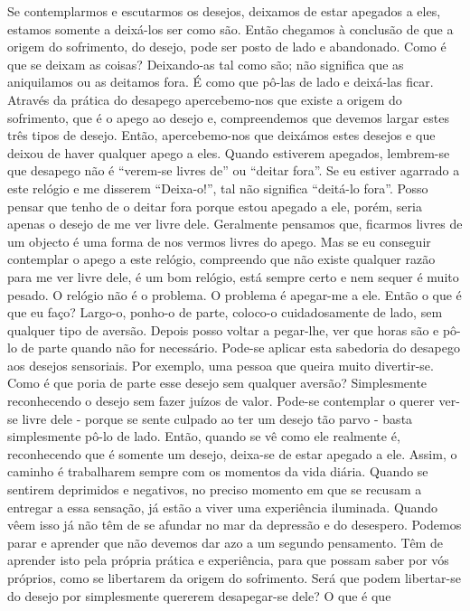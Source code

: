 Se contemplarmos e escutarmos os desejos, deixamos de
estar apegados a eles, estamos somente a deixá-los ser como
são. Então chegamos à conclusão de que a origem do sofrimento, do desejo, pode ser posto de lado e abandonado.
Como é que se deixam as coisas? Deixando-as tal como
são; não significa que as aniquilamos ou as deitamos fora. É
como que pô-las de lado e deixá-las ficar. Através da prática
do desapego apercebemo-nos que existe a origem do sofrimento, que é o apego ao desejo e, compreendemos que devemos largar estes três tipos de desejo. Então, apercebemo-nos
que deixámos estes desejos e que deixou de haver qualquer
apego a eles.
Quando estiverem apegados, lembrem-se que desapego
não é “verem-se livres de” ou “deitar fora”. Se eu estiver
agarrado a este relógio e me disserem “Deixa-o!”, tal não
significa “deitá-lo fora”. Posso pensar que tenho de o deitar
fora porque estou apegado a ele, porém, seria apenas o desejo
de me ver livre dele. Geralmente pensamos que, ficarmos
livres de um objecto é uma forma de nos vermos livres do
apego. Mas se eu conseguir contemplar o apego a este relógio,
compreendo que não existe qualquer razão para me ver livre
dele, é um bom relógio, está sempre certo e nem sequer é
muito pesado. O relógio não é o problema. O problema é apegar-me a ele. Então o que é que eu faço? Largo-o, ponho-o de
parte, coloco-o cuidadosamente de lado, sem qualquer tipo de
aversão. Depois posso voltar a pegar-lhe, ver que horas são e
pô-lo de parte quando não for necessário.
Pode-se aplicar esta sabedoria do desapego aos desejos
sensoriais. Por exemplo, uma pessoa que queira muito divertir-se. Como é que poria de parte esse desejo sem qualquer
aversão? Simplesmente reconhecendo o desejo sem fazer
juízos de valor. Pode-se contemplar o querer ver-se livre dele
- porque se sente culpado ao ter um desejo tão parvo - basta
simplesmente pô-lo de lado. Então, quando se vê como ele
realmente é, reconhecendo que é somente um desejo, deixa-se
de estar apegado a ele.
Assim, o caminho é trabalharem sempre com os momentos
da vida diária. Quando se sentirem deprimidos e negativos,
no preciso momento em que se recusam a entregar a essa
sensação, já estão a viver uma experiência iluminada. Quando
vêem isso já não têm de se afundar no mar da depressão e do
desespero. Podemos parar e aprender que não devemos dar
azo a um segundo pensamento.
Têm de aprender isto pela própria prática e experiência,
para que possam saber por vós próprios, como se libertarem
da origem do sofrimento. Será que podem libertar-se do desejo
por simplesmente quererem desapegar-se dele? O que é que
